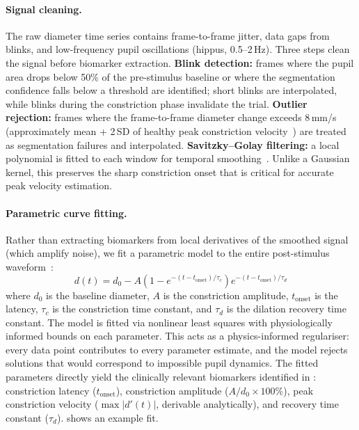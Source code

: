 \paragraph{Signal cleaning.} The raw diameter time series contains frame-to-frame jitter, data gaps from blinks, and low-frequency pupil oscillations (hippus, 0.5--2\,Hz). Three steps clean the signal before biomarker extraction. \textbf{Blink detection:} frames where the pupil area drops below 50\% of the pre-stimulus baseline or where the segmentation confidence falls below a threshold are identified; short blinks are interpolated, while blinks during the constriction phase invalidate the trial. \textbf{Outlier rejection:} frames where the frame-to-frame diameter change exceeds 8\,mm/s (approximately mean + 2\,SD of healthy peak constriction velocity~\cite{bremner2012pupillometric}) are treated as segmentation failures and interpolated. \textbf{Savitzky--Golay filtering:} a local polynomial is fitted to each window for temporal smoothing~\cite{savitzky1964smoothing}. Unlike a Gaussian kernel, this preserves the sharp constriction onset that is critical for accurate peak velocity estimation.

\paragraph{Parametric curve fitting.} Rather than extracting biomarkers from local derivatives of the smoothed signal (which amplify noise), we fit a parametric model to the entire post-stimulus waveform~\cite{fan2011modeling}:
%
\begin{equation}
    d(t) = d_0 - A \left(1 - e^{-(t - t_{\mathrm{onset}})/\tau_c}\right) e^{-(t - t_{\mathrm{onset}})/\tau_d}
    \label{eq:plr-model}
\end{equation}
%
where $d_0$ is the baseline diameter, $A$ is the constriction amplitude, $t_{\mathrm{onset}}$ is the latency, $\tau_c$ is the constriction time constant, and $\tau_d$ is the dilation recovery time constant. The model is fitted via nonlinear least squares with physiologically informed bounds on each parameter. This acts as a physics-informed regulariser: every data point contributes to every parameter estimate, and the model rejects solutions that would correspond to impossible pupil dynamics. The fitted parameters directly yield the clinically relevant biomarkers identified in : constriction latency ($t_{\mathrm{onset}}$), constriction amplitude ($A/d_0 \times 100\%$), peak constriction velocity ($\max |d'(t)|$, derivable analytically), and recovery time constant ($\tau_d$).  shows an example fit.

